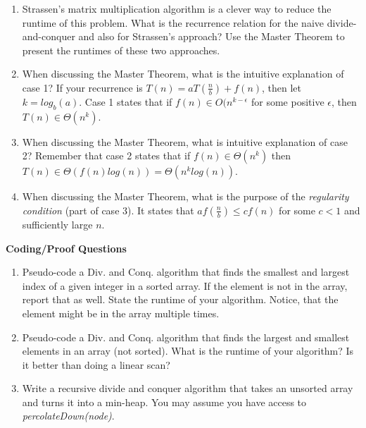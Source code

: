 \documentclass[10pt]{article}
\begin{document}
\begin{enumerate}
	\setlength\itemsep{0.25em}
	\item Strassen's matrix multiplication algorithm is a clever way to reduce the runtime of this problem. What is the recurrence relation for the naive divide-and-conquer and also for Strassen's approach? Use the Master Theorem to present the runtimes of these two approaches.
	\item When discussing the Master Theorem, what is the intuitive explanation of case 1? If your recurrence is $T(n)=aT(\frac{n}{b})+f(n)$, then let $k=log_b(a)$. Case 1 states that if $f(n) \in O(n^{k-\epsilon}$ for some positive $\epsilon$, then $T(n) \in \Theta(n^k)$.
	\item When discussing the Master Theorem, what is intuitive explanation of case 2? Remember that case 2 states that if $f(n) \in \Theta(n^k)$ then $T(n) \in \Theta(f(n)log(n)) = \Theta(n^klog(n))$.
	\item When discussing the Master Theorem, what is the purpose of the \emph{regularity condition} (part of case 3). It states that $af(\frac{n}{b}) \leq cf(n)$ for some $c<1$ and sufficiently large $n$.
\end{enumerate}

\vspace{0.5in}

\textbf{Coding/Proof Questions}
\begin{enumerate}
	\setlength\itemsep{0.25em}
	\item Pseudo-code a Div. and Conq. algorithm that finds the smallest and largest index of a given integer in a sorted array. If the element is not in the array, report that as well. State the runtime of your algorithm. Notice, that the element might be in the array multiple times.
	\item Pseudo-code a Div. and Conq. algorithm that finds the largest and smallest elements in an array (not sorted). What is the runtime of your algorithm? Is it better than doing a linear scan?
	\item Write a recursive divide and conquer algorithm that takes an unsorted array and turns it into a min-heap. You may assume you have access to \emph{percolateDown(node)}.
\end{enumerate}

\end{document}
